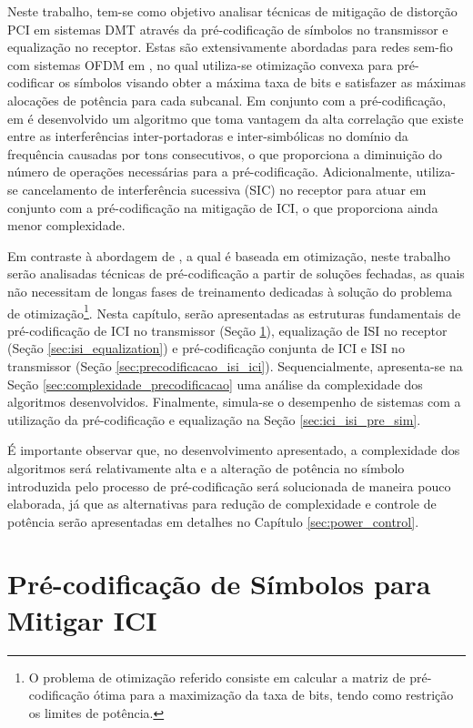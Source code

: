 Neste trabalho, tem-se como objetivo analisar técnicas de mitigação de distorção PCI em sistemas DMT através da pré-codificação de símbolos no transmissor e equalização no receptor. Estas são extensivamente abordadas para redes sem-fio com sistemas OFDM em \cite{malkin2009}, no qual utiliza-se otimização convexa para pré-codificar os símbolos visando obter a máxima taxa de bits e satisfazer as máximas alocações de potência para cada subcanal. Em conjunto com a pré-codificação, em \cite{malkin2009} é desenvolvido um algoritmo que toma vantagem da alta correlação que existe entre as interferências inter-portadoras e inter-simbólicas no domínio da frequência causadas por tons consecutivos, o que proporciona a diminuição do número de operações necessárias para a pré-codificação. Adicionalmente,  utiliza-se cancelamento de interferência sucessiva (SIC) no receptor para atuar em conjunto com a pré-codificação na mitigação de ICI, o que proporciona ainda menor complexidade.

Em contraste à abordagem de \cite{malkin2009}, a qual é baseada em otimização, neste trabalho serão analisadas técnicas de pré-codificação a partir de soluções fechadas, as quais não necessitam de longas fases de treinamento dedicadas à solução do problema de otimização\footnote{O problema de otimização referido consiste em calcular a matriz de pré-codificação ótima para a maximização da taxa de bits, tendo como restrição os limites de potência.}. Nesta capítulo, serão apresentadas as estruturas fundamentais de pré-codificação de ICI no transmissor (Seção \ref{sec:prec_ICI}), equalização de ISI no receptor (Seção \ref{sec:isi_equalization}) e pré-codificação conjunta de ICI e ISI no transmissor (Seção \ref{sec:precodificacao_isi_ici}). Sequencialmente, apresenta-se na Seção \ref{sec:complexidade_precodificacao} uma análise da complexidade dos algoritmos desenvolvidos. Finalmente, simula-se o desempenho de sistemas com a utilização da pré-codificação e equalização na Seção \ref{sec:ici_isi_pre_sim}. 

É importante observar que, no desenvolvimento apresentado, a complexidade dos algoritmos  será relativamente alta e a alteração de potência no símbolo introduzida pelo processo de pré-codificação será solucionada de maneira pouco elaborada, já que as alternativas para redução de complexidade e controle de potência serão apresentadas em detalhes no Capítulo \ref{sec:power_control}. 

\section{Pré-codificação de Símbolos para Mitigar ICI}
\label{sec:prec_ICI}

